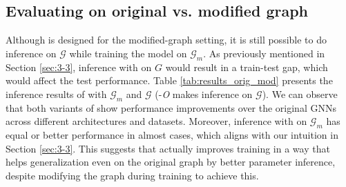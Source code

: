\documentclass[letterpaper]{article} \usepackage{aaai21}  \usepackage{times}  \usepackage{helvet} \usepackage{courier}  \usepackage[hyphens]{url}  \usepackage{graphicx} \urlstyle{rm} \def\UrlFont{\rm}  \usepackage{natbib}  \usepackage{caption} \frenchspacing  \setlength{\pdfpagewidth}{8.5in}  \setlength{\pdfpageheight}{11in}
\begin{document}
\subsection{Evaluating \methodtwo on original vs. modified graph}
Although \methodtwo is designed for the modified-graph setting, it is still  possible to do inference on $\mathcal{G}$ while training the model on $\mathcal{G}_m$. As previously mentioned in Section \ref{sec:3-3}, inference with \methodtwo on $G$ would result in a train-test gap, which would affect the test performance. Table \ref{tab:results_orig_mod} presents the inference results of \methodtwo with $\mathcal{G}_m$ and $\mathcal{G}$ (\methodtwo-\textit{O} makes inference on $\mathcal{G}$). We can observe that both variants of \methodtwo show performance improvements over the original GNNs across different architectures and datasets. Moreover, inference with \methodtwo on $\mathcal{G}_m$ has equal or better performance in almost cases, which aligns with our intuition in Section \ref{sec:3-3}.  This suggests that \methodtwo actually improves training in a way that helps generalization even on the original graph by better parameter inference, despite modifying the graph during training to achieve this. 
\end{document}
